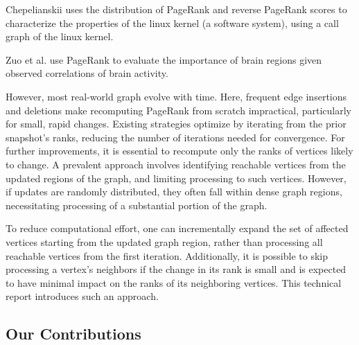 Chepelianskii \cite{chepelianskii2010towards} uses the distribution of PageRank and reverse PageRank scores to characterize the properties of the linux kernel (a software system), using a call graph of the linux kernel.

Zuo et al. \cite{zuo2012network} use PageRank to evaluate the importance of brain regions given observed correlations of brain activity.


However, most real-world graph evolve with time. Here, frequent edge insertions and deletions make recomputing PageRank from scratch impractical, particularly for small, rapid changes. Existing strategies optimize by iterating from the prior snapshot's ranks, reducing the number of iterations needed for convergence. For further improvements, it is essential to recompute only the ranks of vertices likely to change. A prevalent approach involves identifying reachable vertices from the updated regions of the graph, and limiting processing to such vertices. However, if updates are randomly distributed, they often fall within dense graph regions, necessitating processing of a substantial portion of the graph.

To reduce computational effort, one can incrementally expand the set of affected vertices starting from the updated graph region, rather than processing all reachable vertices from the first iteration. Additionally, it is possible to skip processing a vertex's neighbors if the change in its rank is small and is expected to have minimal impact on the ranks of its neighboring vertices. This technical report introduces such an approach.




\subsection{Our Contributions}

